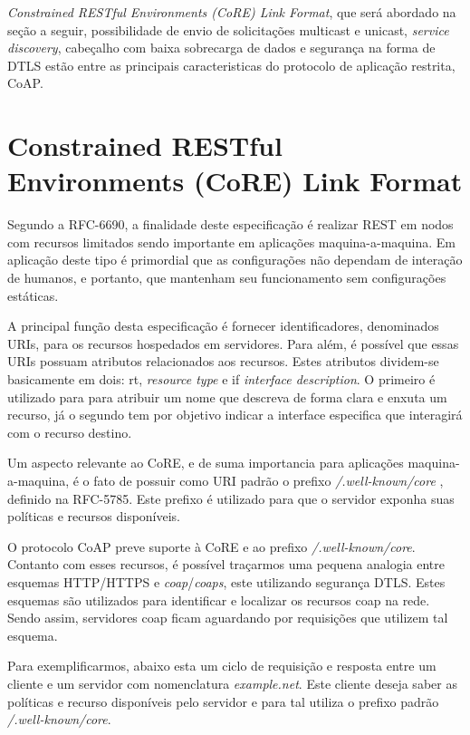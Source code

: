 \textit{Constrained RESTful Environments (CoRE) Link Format}, que será abordado na seção a seguir, possibilidade de envio de solicitações multicast e unicast, \textit{service discovery}, cabeçalho com baixa sobrecarga de dados e segurança na forma de DTLS\cite{rfc6347}
estão entre as principais caracteristicas do protocolo de aplicação restrita, CoAP.



\section{Constrained RESTful Environments (CoRE) Link Format}

Segundo a RFC-6690, a finalidade deste especificação é realizar REST em nodos com recursos limitados sendo importante em aplicações maquina-a-maquina\cite{rfc6690}.
Em aplicação deste tipo é primordial que as configurações não dependam de interação de humanos, e portanto, que mantenham seu funcionamento sem configurações estáticas.


A principal função desta especificação é fornecer identificadores, denominados URIs, para os recursos hospedados em servidores. 
Para além, é possível que essas URIs possuam atributos relacionados aos recursos.
Estes atributos dividem-se basicamente em dois: rt, \textit{resource type} e if \textit{interface description}.
O primeiro é utilizado para para atribuir um nome que descreva de forma clara e enxuta um recurso,
já o segundo tem por objetivo indicar a interface especifica que interagirá com o recurso destino.

Um aspecto relevante ao CoRE, e de suma importancia para aplicações maquina-a-maquina, é o fato de possuir como URI padrão o prefixo \textit{/.well-known/core} , definido na RFC-5785\cite{rfc5785}.
Este prefixo é utilizado para que o servidor exponha suas políticas e recursos disponíveis.

O protocolo CoAP preve suporte à CoRE e ao prefixo \textit{/.well-known/core}. Contanto com esses recursos, é possível traçarmos uma pequena analogia entre
esquemas HTTP/HTTPS e \textit{coap}/\textit{coaps}, este utilizando segurança DTLS.
Estes esquemas são utilizados para identificar e localizar os recursos coap na rede.
Sendo assim, servidores coap ficam aguardando por requisições que utilizem tal esquema.

Para exemplificarmos, abaixo esta um ciclo de requisição e resposta entre um cliente e um servidor com nomenclatura \textit{example.net}.
Este cliente deseja saber as políticas e recurso disponíveis pelo servidor e para tal utiliza o prefixo padrão \textit{/.well-known/core}.

